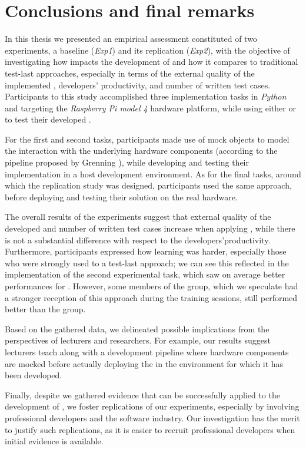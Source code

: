 \chapter{Conclusions and final remarks}
\label{chap:7_conclusions}
In this thesis we presented an empirical assessment constituted of two experiments, a baseline (\textit{Exp1}) and its replication (\textit{Exp2}), with the objective of investigating how \tdd impacts the development of \ess and how it compares to traditional test-last approaches, especially in terms of the external quality of the implemented \es, developers' productivity, and number of written test cases. 
Participants to this study accomplished three implementation tasks in \textit{Python} and targeting the \textit{Raspberry Pi model 4} hardware platform, while using either \tdd or \notdd to test their developed \ess.

For the first and second tasks, participants made use of mock objects to model the interaction with the underlying hardware components (according to the pipeline proposed by Grenning \cite{TDDEC}), while developing and testing their implementation in a host development environment. As for the final tasks, around which the replication study was designed, participants used the same approach, before deploying and testing their solution on the real hardware.

The overall results of the experiments suggest that external quality of the developed \ess and number of written test cases increase when applying \tdd, while there is not a substantial difference with respect to the developers'productivity. Furthermore, participants expressed how learning \tdd was harder, especially those who were strongly used to a test-last approach; we can see this reflected in the implementation of the second experimental task, which saw on average better performances for \notdd. However, some members of the \tdd group, which we speculate had a stronger reception of this approach during the training sessions, still performed better than the \notdd group.

Based on the gathered data, we delineated possible implications from the perspectives of lecturers and researchers. For example, our results suggest lecturers teach \tdd along with a development pipeline where hardware components are mocked before actually deploying the \es in the environment for which it has been developed. 

Finally, despite we gathered evidence that \tdd can be successfully applied to the development of \ess, we foster replications of our experiments, especially by involving professional developers and the software industry. 
Our investigation has the merit to justify such replications, as it is easier to recruit professional developers when initial evidence is available. 

